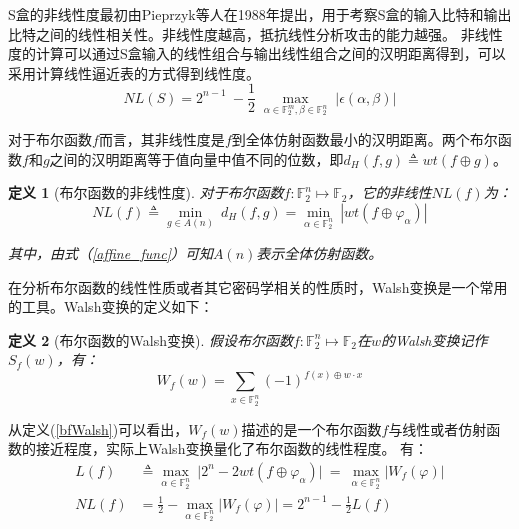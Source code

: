 \documentclass{xduugthesis}
\newtheorem{definition}{定义}
\begin{document}
S盒的非线性度最初由Pieprzyk等人在1988年提出\cite{pieprzyk1988towards}，用于考察S盒的输入比特和输出比特之间的线性相关性。非线性度越高，抵抗线性分析攻击的能力越强\cite{冯登国2000分组密码的设计与分析}。
非线性度的计算可以通过S盒输入的线性组合与输出线性组合之间的汉明距离得到，可以采用计算线性逼近表的方式得到线性度。
\begin{equation}
    NL(S) = 2^{n-1}\: - \frac{1}{2} \; \mathop{max}\limits_{\alpha \in \mathbb{F}_2^m, \beta \in \mathbb{F}_2^n} \; |\epsilon(\alpha, \beta)|
\end{equation}\par

对于布尔函数$f$而言，其非线性度是$f$到全体仿射函数最小的汉明距离。两个布尔函数$f$和$g$之间的汉明距离等于值向量中值不同的位数，即$d_H (f,g)\triangleq wt(f \oplus g)$。
\begin{definition}[布尔函数的非线性度]
    对于布尔函数$f:\mathbb{F}_2^n \mapsto \mathbb{F}_2$，它的非线性$NL(f)$为：
    \begin{equation}
        NL(f) \triangleq \mathop{min} \limits_{g \in A(n)} \: d_H(f,g)= \mathop{min}\limits_{\alpha \in \mathbb{F}_2^n} \: |wt(f\oplus \varphi_{\alpha}) |
    \end{equation}\par
    其中，由式（\ref{affine_func}）可知$A(n)$表示全体仿射函数。
\end{definition}\par

在分析布尔函数的线性性质或者其它密码学相关的性质时，Walsh变换是一个常用的工具。Walsh变换的定义如下：
\begin{definition}[布尔函数的Walsh变换]
    假设布尔函数$f:\mathbb{F}_2^n \mapsto \mathbb{F}_2$在$w$的Walsh变换记作$S_f(w)$，有：
    \begin{equation}\label{bfWalsh}
        W_f(w) = \mathop{\sum}\limits_{x \in \mathbb{F}_2^n} (-1)^{f(x)\oplus w\cdot x}
    \end{equation}\par
\end{definition}\par

从定义(\ref{bfWalsh})可以看出，$W_f(w)$描述的是一个布尔函数$f$与线性或者仿射函数的接近程度，实际上Walsh变换量化了布尔函数的线性程度。
有：
\begin{equation}
    \begin{aligned}
        L(f) &\triangleq \mathop{max}\limits_{\alpha \in \mathbb{F}_2^n}\: \lvert 2^n -2wt(f \oplus \varphi_{\alpha}) \rvert \:= \: \mathop{max}\limits_{\alpha \in \mathbb{F}_2^n} \lvert W_f(\varphi)\rvert \\
        NL(f) &= \frac{1}{2} - \mathop{max}\limits_{\alpha \in \mathbb{F}_2^n} \lvert W_f(\varphi)\rvert = 2^{n-1} - \frac{1}{2}L(f)
    \end{aligned}
\end{equation}
\end{document}
